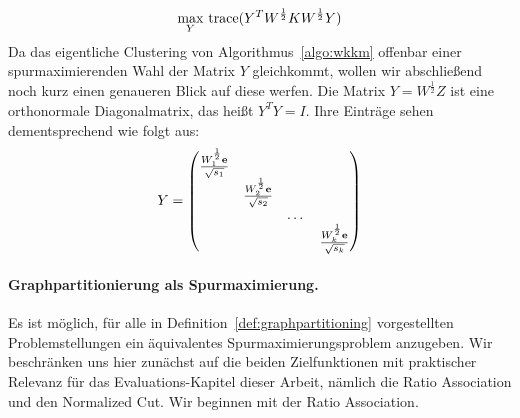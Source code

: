 \begin{align}
\label{formula:wkkm-tracemax}
	\max_{Y}{} \operatorname*{trace}( Y^T W^{\frac{1}{2}} K W^{\frac{1}{2}} Y )
\end{align}
Da das eigentliche Clustering von Algorithmus~\ref{algo:wkkm} offenbar einer spurmaximierenden Wahl der Matrix $Y$ gleichkommt,
wollen wir abschließend noch kurz einen genaueren Blick auf diese werfen.
Die Matrix $Y = W^{\frac{1}{2}} Z$ ist eine orthonormale Diagonalmatrix, das heißt $Y^T Y = I$. Ihre Einträge sehen
dementsprechend wie folgt aus:
\[ Y = 	\begin{pmatrix}
			\frac{W_1^{\frac{1}{2}} \mathbf{e}}{\sqrt{s_1}} & & & \\
			& \frac{W_2^{\frac{1}{2}} \mathbf{e}}{\sqrt{s_2}} & & \\
			& & \dots & \\
			& & & \frac{W_k^{\frac{1}{2}} \mathbf{e}}{\sqrt{s_k}}
		\end{pmatrix} \]

\paragraph{Graphpartitionierung als Spurmaximierung.}
Es ist möglich, für alle in Definition~\ref{def:graphpartitioning} vorgestellten Problemstellungen ein äquivalentes
Spurmaximierungsproblem anzugeben. Wir beschränken uns hier zunächst auf die beiden Zielfunktionen mit praktischer Relevanz
für das Evaluations-Kapitel dieser Arbeit, nämlich die Ratio Association und den Normalized Cut. Wir beginnen mit der
Ratio Association.

